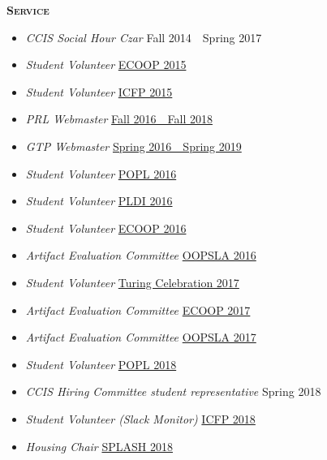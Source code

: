 \documentclass{article}
\newcommand{\mysection}[1]{\vspace{0.5cm} \noindent\textsc{\textbf{#1}}~\hrulefill}
\newcommand{\datespan}[2]{#1~\textendash{}~#2}
\begin{document}
\mysection{Service}
\begin{itemize}
  \item \emph{CCIS Social Hour Czar} \hfill {\datespan{Fall 2014}{Spring 2017}}
  \item \emph{Student Volunteer} \hfill \href{http://2015.ecoop.org/}{ECOOP 2015}
  \item \emph{Student Volunteer} \hfill \href{http://icfpconference.org/icfp2015/}{ICFP 2015}
  \item \emph{PRL Webmaster} \hfill \href{https://github.com/nuprl/website}{\datespan{Fall 2016}{Fall 2018}}
  \item \emph{GTP Webmaster} \hfill \href{https://github.com/nuprl/gtp.github.io}{\datespan{Spring 2016}{Spring 2019}}
  \item \emph{Student Volunteer} \hfill \href{http://conf.researchr.org/home/POPL-2016}{POPL 2016}
  \item \emph{Student Volunteer} \hfill \href{http://conf.researchr.org/home/PLDI-2016}{PLDI 2016}
  \item \emph{Student Volunteer} \hfill \href{http://2016.ecoop.org/}{ECOOP 2016}
  \item \emph{Artifact Evaluation Committee} \hfill \href{http://2016.splashcon.org/track/splash-2016-artifacts}{OOPSLA 2016}
  \item \emph{Student Volunteer} \hfill \href{https://www.acm.org/turing-award-50/conference}{Turing Celebration 2017}
  \item \emph{Artifact Evaluation Committee} \hfill \href{https://2017.ecoop.org/track/ecoop-2017-Artifacts}{ECOOP 2017}
  \item \emph{Artifact Evaluation Committee} \hfill \href{https://2017.splashcon.org/track/splash-2017-OOPSLA-Artifacts}{OOPSLA 2017}
  \item \emph{Student Volunteer} \hfill \href{http://conf.researchr.org/home/POPL-2018}{POPL 2018}
  \item \emph{CCIS Hiring Committee student representative} \hfill {Spring 2018}
  \item \emph{Student Volunteer (Slack Monitor)} \hfill \href{https://icfp18.sigplan.org/committee/icfp-2018-organizing-committee}{ICFP 2018}
  \item \emph{Housing Chair} \hfill \href{https://2018.splashcon.org/committee/splash-2018-organizing-committee}{SPLASH 2018}
\end{itemize}
\end{document}
